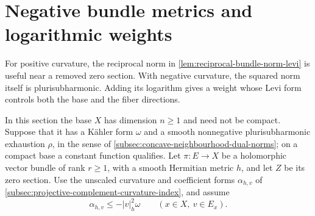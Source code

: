 \section{Negative bundle metrics and logarithmic weights}
\label{subsec:negative-bundle-logarithmic-weights}

For positive curvature, the reciprocal norm in
\cref{lem:reciprocal-bundle-norm-levi} is useful near a removed
zero section. With negative curvature, the squared norm itself
is plurisubharmonic. Adding its logarithm gives a weight whose
Levi form controls both the base and the fiber directions.

In this section the base $X$ has dimension $n\geq1$ and need not
be compact. Suppose that it has a K\"ahler form $\omega$ and a
smooth nonnegative plurisubharmonic exhaustion $\rho$, in the
sense of \cref{subsec:concave-neighbourhood-dual-norms}; on a
compact base a constant function qualifies. Let $\pi\colon E\to X$
be a holomorphic vector bundle of rank $r\geq1$, with a smooth
Hermitian metric $h$, and let $Z$ be its zero section. Use the
unscaled curvature and coefficient forms $\alpha_{h,v}$ of
\cref{subsec:projective-complement-curvature-index}, and assume
\[
 \alpha_{h,v}\leq-|v|_h^2\omega
 \qquad(x\in X,\ v\in E_x).
\]


